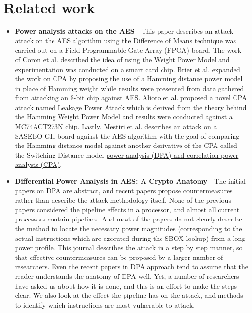     \section{Related work} \label{sec:RelatedWork}
    \begin{itemize}
    \item \textbf{Power analysis attacks on the AES}\cite{lo2017power} -
     This paper describes an attack attack on the AES algorithm using the Difference of Means technique was carried out on a Field-Programmable Gate Array (FPGA) board.
     The work of Coron et al. described the idea of using the Weight Power Model and experimentation was conducted on a smart card chip. Brier et al. expanded the work on CPA by proposing the use of a Hamming distance power model in place of Hamming weight while results were presented from data gathered from attacking an 8-bit chip against AES.
     Alioto et al. proposed a novel CPA attack named Leakage Power Attack which is derived from the theory behind the Hamming Weight Power Model and results were conducted against a MC74ACT273N chip.
     Lastly, Mestiri et al. describes an attack on a SASEBO-GII board against the AES algorithm with the goal of comparing the Hamming distance model against another derivative of the CPA called the Switching Distance model
    \href{https://doi.org/10.1080/23742917.2016.1231523}{power analysis (DPA) and correlation power analysis (CPA)}.

    \item  \textbf{Differential Power Analysis in AES: A Crypto Anatomy}\cite{jude_differential_Power_analysis} -
    The  initial  papers  on  DPA  are  abstract,  and  recent  papers  propose countermeasures  rather  than  describe  the  attack  methodology  itself.
    None  of  the  previous  papers considered the pipeline effects in a processor, and almost all current processors contain pipelines. 
    And most  of  the papers  do  not clearly  describe  the method  to  locate the  necessary power  magnitudes (corresponding to  the actual instructions which  are executed during  the SBOX lookup) from a long power profile.  
    This journal describes the attack in a step by step manner, so that effective countermeasures can be proposed by a larger number of researchers. 
    Even the recent papers in DPA approach tend to assume that the reader understands the anatomy of DPA well.
    Yet, a number of researchers have asked us about how it is done, and this is an effort to  make the steps clear. 
    We also look at the effect the pipeline has on the attack, and methods to identify which instructions are most vulnerable to attack.


\end{itemize}

